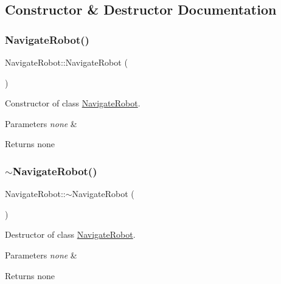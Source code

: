 \subsection{Constructor \& Destructor Documentation}
\mbox{\label{class_navigate_robot_ac27678ab7ff5b0416f661e899a50f9b4}} 
\subsubsection{\texorpdfstring{Navigate\+Robot()}{NavigateRobot()}}
{\footnotesize\ttfamily Navigate\+Robot\+::\+Navigate\+Robot (\begin{DoxyParamCaption}{ }\end{DoxyParamCaption})}



Constructor of class \hyperlink{class_navigate_robot}{Navigate\+Robot}. 


\begin{DoxyParams}{Parameters}
{\em none} & \\
\hline
\end{DoxyParams}
\begin{DoxyReturn}{Returns}
none 
\end{DoxyReturn}
\mbox{\label{class_navigate_robot_a004a6768d65abf86fba9e3fa586c54e6}} 
\subsubsection{\texorpdfstring{$\sim$\+Navigate\+Robot()}{~NavigateRobot()}}
{\footnotesize\ttfamily Navigate\+Robot\+::$\sim$\+Navigate\+Robot (\begin{DoxyParamCaption}{ }\end{DoxyParamCaption})}



Destructor of class \hyperlink{class_navigate_robot}{Navigate\+Robot}. 


\begin{DoxyParams}{Parameters}
{\em none} & \\
\hline
\end{DoxyParams}
\begin{DoxyReturn}{Returns}
none 
\end{DoxyReturn}


